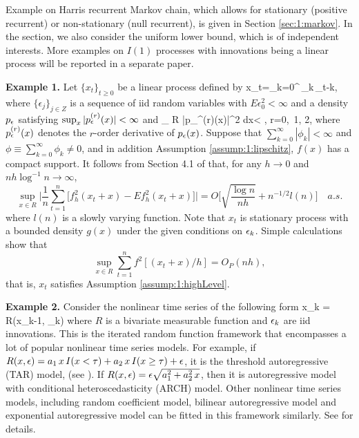 Example on Harris recurrent Markov chain, which allows for stationary (positive recurrent) or non-stationary (null recurrent), is given in Section \ref{sec:1:markov}. In the section, we also consider the uniform lower bound, which is of independent interests.
More examples on $I(1)$ processes with innovations being a linear process will be reported in a separate paper.

\medskip
{\bf Example 1.} Let $\{x_{t}\}_{t\geq 0}$ be a linear process defined by
\bestar
x_{t}=\sum_{k=0}^{\infty }\,\phi _{k}\,\epsilon_{t-k},
\eestar
where $\{\epsilon _{j} \}_{j\in Z}$ is a sequence of iid
random variables with $E\epsilon _{0}^{2}<\infty$ and a density $p_\epsilon$ satisfying $\sup_x|p_\epsilon^{(r)}(x)|<\infty$ and
\bestar
\int_{ R} |p_\ep^{(r)}(x)|^2  dx< \infty, \quad r=0,\ 1, 2,
\eestar
where $p_\epsilon^{(r)}(x)$ denotes the $r$-order derivative of $p_\epsilon(x)$. Suppose that $\sum_{k=0}^\infty |\phi_k| < \infty$ and $\phi \equiv \sum_{k=0}^\infty \phi_k \ne 0$, and in addition Assumption \ref{assump:1:lipschitz}, $f(x)$ has a compact support. It follows from Section 4.1 of \cite{wuhuanghuang2010} that,
 for any $h \rightarrow 0$ and $nh \log^{-1}n \rightarrow \infty$,
\begin{equation}
\sup_{x \in  R} \Big | \frac{1}{n} \sum_{t =1}^{n} \big[f_h^2(x_t + x) - Ef_h^2(x_t + x)\big] \Big | = O \Big [\sqrt{\frac{\log n}{nh}} + n^{-1/2} l(n) \Big ] \quad a.s.
\end{equation}
where $l(n)$ is a slowly varying function.
Note that $x_t$ is stationary process with a bounded density $g(x)$ under the given conditions on $\epsilon_k$. Simple calculations show that
\begin{equation}
\sup_{x \in  R} \sum_{t =1}^{n} f^2[(x_t + x)/h] = O_P(nh),
\end{equation}
that is, $x_t$ satisfies Assumption \ref{assump:1:highLevel}.

\medskip
{\bf Example 2.} Consider the nonlinear time series of the following form
\bestar
x_k = R(x_{k-1}, \ep_k)
\eestar
where $R$ is a bivariate measurable function and $\epsilon_k$ are iid innovations. This is the iterated random function framework that encompasses a lot of popular nonlinear time series models. For example, if $R(x, \epsilon) = a_1\, x\,  I(x < \tau) + a_2\, x\,  I(x \ge \tau) + \epsilon$, it is the threshold autoregressive (TAR) model, (see \cite{tong1990}). If $R(x, \epsilon) = \epsilon \sqrt{a_1^2 + a_2^2\, x}$, then it is autoregressive model with conditional heteroscedasticity (ARCH) model. Other nonlinear time series models, including random coefficient model, bilinear autoregressive model and exponential autoregressive model can be fitted in this framework similarly. See \cite{wushao2004} for details.

